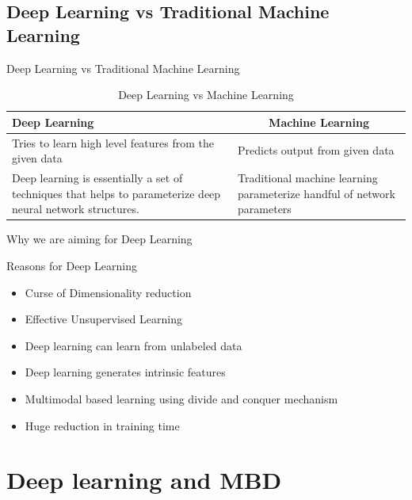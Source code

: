 \documentclass[newPxFont]{beamer}
\begin{document}
\subsection{Deep Learning vs Traditional Machine Learning}
\begin{frame}[c]{Deep Learning vs Traditional Machine Learning}

\begin{table}[]
	\begin{tabular}[]{|p{5cm}|p{5cm}|}
		\toprule
		\textbf{Deep Learning}			& \multicolumn{1}{c|}{\textbf{Machine Learning}} \\
		\midrule
		Tries to learn high level features from the given data  & Predicts output from given data			\\[0.25em]
		Deep learning is essentially a set of techniques that helps to parameterize deep neural network structures.
				& 	Traditional machine learning parameterize handful of network parameters	\\[0.25em]
		
		\bottomrule
	\end{tabular}
    \caption{Deep Learning vs Machine Learning}
\end{table}
\end{frame}

\begin{frame}[c]{Why we are aiming for Deep Learning}

\begin{exampleblock}{Reasons for Deep Learning}
\begin{itemize}
	\item{Curse of Dimensionality reduction}
    \item{Effective Unsupervised Learning}
    \item{Deep learning can learn from unlabeled data}
    \item{Deep learning generates intrinsic features}
    \item{Multimodal based learning using divide and conquer mechanism}
    \item{Huge reduction in training time}
\end{itemize}
\end{exampleblock}

\end{frame}

\section{Deep learning and MBD}
\end{document}
